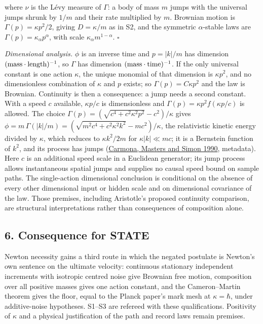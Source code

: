 \documentclass[11pt,a4paper]{article}
\begin{document}
where \(\nu\) is the Lévy measure of \(\Gamma\): a body of mass \(m\)
jumps with the universal jumps shrunk by \(1/m\) and their rate
multiplied by \(m\). Brownian motion is \(\Gamma(p)=\kappa p^2/2\),
giving \(D=\kappa/m\) as in S2, and the symmetric \(\alpha\)-stable laws
are \(\Gamma(p)=\kappa_\alpha p^\alpha\), with scale
\(\kappa_\alpha m^{1-\alpha}\). \(\square\)

\emph{Dimensional analysis.} \(\phi\) is an inverse time and \(p=|k|/m\)
has dimension \(({\rm mass}\cdot{\rm length})^{-1}\), so \(\Gamma\) has
dimension \(({\rm mass}\cdot{\rm time})^{-1}\). If the only universal
constant is one action \(\kappa\), the unique monomial of that dimension
is \(\kappa p^2\), and no dimensionless combination of \(\kappa\) and
\(p\) exists; so \(\Gamma(p)=C\kappa p^2\) and the law is Brownian.
Continuity is then a consequence: a jump needs a second constant. With a
speed \(c\) available, \(\kappa p/c\) is dimensionless and
\(\Gamma(p)=\kappa p^2f(\kappa p/c)\) is allowed. The choice
\(\Gamma(p)=(\sqrt{c^4+c^2\kappa^2p^2}-c^2)/\kappa\) gives
\(\phi=m\,\Gamma(|k|/m)=(\sqrt{m^2c^4+c^2\kappa^2k^2}-mc^2)/\kappa\),
the relativistic kinetic energy divided by \(\kappa\), which reduces to
\(\kappa k^2/2m\) for \(\kappa|k|\ll mc\); it is a Bernstein function of
\(k^2\), and its process has jumps
(\href{https://doi.org/10.1016/0022-1236(90)90049-Q}{Carmona, Masters
and Simon 1990}, metadata). Here \(c\) is an additional speed scale in a
Euclidean generator; its jump process allows instantaneous spatial jumps
and supplies no causal speed bound on sample paths. The single-action
dimensional conclusion is conditional on the absence of every other
dimensional input or hidden scale and on dimensional covariance of the
law. Those premises, including Aristotle's proposed continuity
comparison, are structural interpretations rather than consequences of
composition alone.

\hypertarget{consequence-for-state}{%
\subsection{6. Consequence for STATE}\label{consequence-for-state}}

Newton necessity gains a third route in which the negated postulate is
Newton's own sentence on the ultimate velocity: continuous stationary
independent increments with isotropic centred noise give Brownian free
motion, composition over all positive masses gives one action constant,
and the Cameron--Martin theorem gives the floor, equal to the Planck
paper's mark mesh at \(\kappa=\hbar\), under additive-noise hypotheses.
S1--S3 are refereed with these qualifications. Positivity of \(\kappa\)
and a physical justification of the path and record laws remain
premises.
\end{document}

